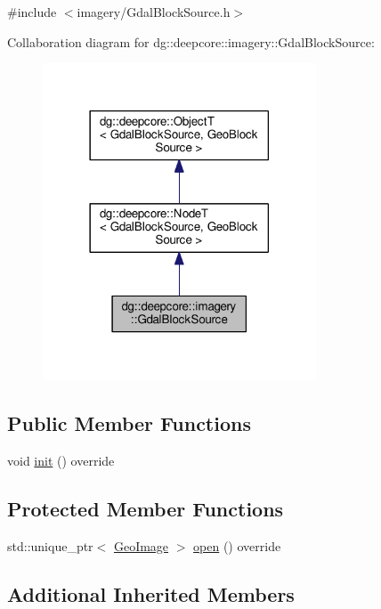 {\ttfamily \#include $<$imagery/\+Gdal\+Block\+Source.\+h$>$}



Collaboration diagram for dg\+:\+:deepcore\+:\+:imagery\+:\+:Gdal\+Block\+Source\+:
\nopagebreak
\begin{figure}[H]
\begin{center}
\leavevmode
\includegraphics[width=230pt]{classdg_1_1deepcore_1_1imagery_1_1_gdal_block_source__coll__graph}
\end{center}
\end{figure}
\subsection*{Public Member Functions}
\begin{DoxyCompactItemize}
\item 
void \hyperlink{classdg_1_1deepcore_1_1imagery_1_1_gdal_block_source_a7378df39c19d8a7c6bee08e1f991afd1}{init} () override
\end{DoxyCompactItemize}
\subsection*{Protected Member Functions}
\begin{DoxyCompactItemize}
\item 
std\+::unique\+\_\+ptr$<$ \hyperlink{classdg_1_1deepcore_1_1imagery_1_1_geo_image}{Geo\+Image} $>$ \hyperlink{classdg_1_1deepcore_1_1imagery_1_1_gdal_block_source_a8a2dfb2a10928fb78441a76daa7c3b19}{open} () override
\end{DoxyCompactItemize}
\subsection*{Additional Inherited Members}


